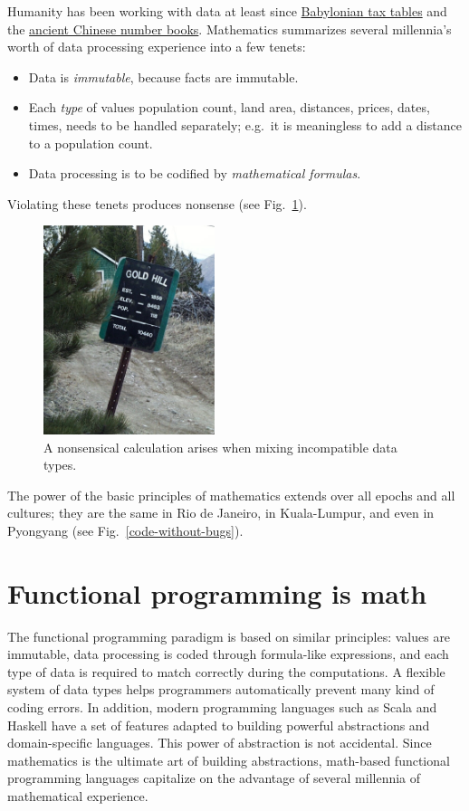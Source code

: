 Humanity has been working with data at least since \href{https://www.nytimes.com/2017/08/29/science/trigonometry-babylonian-tablet.html?mcubz=0}{Babylonian tax tables}
and the \href{http://quatr.us/china/science/chinamath.htm}{ancient Chinese number books}.
Mathematics summarizes several millennia's worth of data processing
experience into a few tenets:
\begin{itemize}
\item Data is \emph{immutable}, because facts are immutable. 
\item Each \emph{type} of values \textendash{} population count, land area,
distances, prices, dates, times, \textendash{} needs to be handled
separately; e.g.\ it is meaningless to add a distance to a population
count.
\item Data processing is to be codified by \emph{mathematical formulas}. 
\end{itemize}
Violating these tenets produces nonsense (see Fig.\ \ref{nonsense-math}).
\begin{figure}
\begin{centering}
\includegraphics[width=5cm]{type-error}
\par\end{centering}
\caption{A nonsensical calculation arises when mixing incompatible data types.}
\label{nonsense-math}
\end{figure}

The power of the basic principles of mathematics extends over all
epochs and all cultures; they are the same in Rio de Janeiro, in Kuala-Lumpur,
and even in Pyongyang (see Fig.\ \ref{code-without-bugs}).

\section{Functional programming is math}

The functional programming paradigm is based on similar principles:
values are immutable, data processing is coded through formula-like
expressions, and each type of data is required to match correctly
during the computations. A flexible system of data types helps programmers
automatically prevent many kind of coding errors. In addition, modern
programming languages such as Scala and Haskell have a set of features
adapted to building powerful abstractions and domain-specific languages.
This power of abstraction is not accidental. Since mathematics is
the ultimate art of building abstractions, math-based functional programming
languages capitalize on the advantage of several millennia of mathematical
experience.

